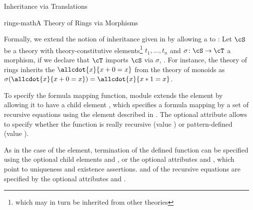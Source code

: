 \begin{omgroup}[id=complex-theories,short=Complex Theories,
                            creators=miko,contributors=frabe]
\begin{omgroup}[id=morphisms]{Inheritance via Translations}
\begin{module}[id=morphisms]
\begin{myfig}{rings-math}{A Theory of Rings via Morphisms}
\end{myfig}

Formally, we extend the notion of inheritance given in {} by allowing a
{} to : Let $\cS$ be a theory with theory-constitutive
elements\footnote{which may in turn be inherited from other theories} $t_1,\ldots,t_n$ and
$\sigma\colon\cS\to\cT$ a morphism, if we declare that $\cT$ imports $\cS$ via $\sigma$,
. For instance, the theory of rings inherits the {}
$\allcdot{x}{x+0=x}$ from the theory of monoids as
$\sigma(\allcdot{x}{x+0=x})=\allcdot{x}{x*1=x}$.

\begin{definition}[id=morphism.def]
  To specify the formula mapping function, module {} extends the
  {} element by allowing it to have a child element {},
  which specifies a formula mapping by a set of recursive equations using the
  {} element described in {}. The optional attribute
  {} allows to specify whether the function is really recursive
  (value {}) or pattern-defined (value
  {}).
\end{definition}

As in the case of the {} element, termination of the defined function
can be specified using the optional child elements {} and
{}, or the optional attributes {} and
{}, which point to uniqueness and existence
assertions. {} and {} of the
recursive equations are specified by the optional attributes
{} and {}.


\end{module}
\end{omgroup}
\end{omgroup}
